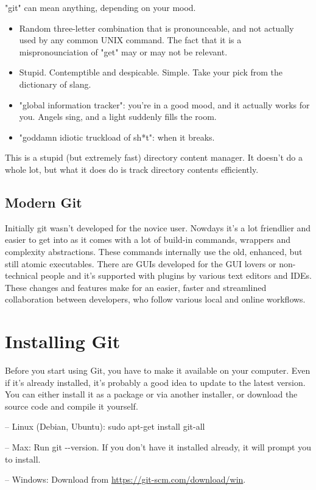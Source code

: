 \documentclass[12pt,a4]{article}
\newcommand{\ilcode}[1]{\textcolor[RGB]{160, 110, 220}{#1}}
\begin{document}
"git" can mean anything, depending on your mood.
\begin{itemize}
\vspace*{-10pt}
\item Random three-letter combination that is pronounceable, and not actually
	used by any common UNIX command. The fact that it is a mispronounciation of
	"get" may or may not be relevant.
\vspace*{-3pt}
\item Stupid. Contemptible and despicable. Simple. Take your pick from the
	dictionary of slang.
\vspace*{-3pt}
\item "global information tracker": you're in a good mood, and it actually
   works for you. Angels sing, and a light suddenly fills the room.
\vspace*{-3pt}
\item "goddamn idiotic truckload of sh*t": when it breaks.
\vspace*{-10pt}
\end{itemize}

This is a stupid (but extremely fast) directory content manager. It doesn't do
a whole lot, but what it does do is track directory contents efficiently.

\subsection{Modern Git}
Initially git wasn't developed for the novice user. Nowdays it's a lot
friendlier and easier to get into as it comes with a lot of build-in commands,
wrappers and complexity abstractions. These commands internally use the old,
enhanced, but still atomic executables. There are GUIs developed for the GUI
lovers or non-technical people and it's supported with plugins by various text
editors and IDEs. These changes and features make for an easier, faster and
streamlined collaboration between developers, who follow various local and
online workflows.

\section{Installing Git}
Before you start using Git, you have to make it available on your computer. Even
if it’s already installed, it’s probably a good idea to update to the latest
version. You can either install it as a package or via another installer, or
download the source code and compile it yourself.

{\sf -- Linux (Debian, Ubuntu):} \ilcode{sudo apt-get install git-all}

{\sf -- Max:} Run \ilcode{git -{}-version}. If you don’t have it installed
already, it will prompt you to install.

{\sf -- Windows:} Download from \url{https://git-scm.com/download/win}.
\end{document}
